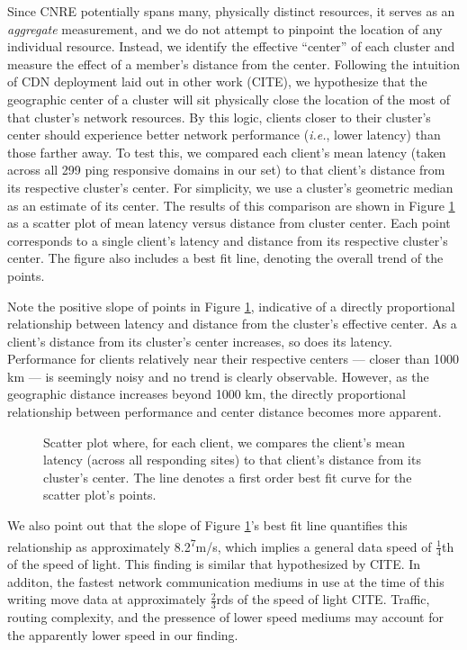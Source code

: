 Since CNRE potentially spans many, physically distinct resources, it serves as
an \emph{aggregate} measurement, and we do not attempt to pinpoint the location
of any individual resource. Instead, we identify the effective ``center'' of
each cluster and measure the effect of a member's distance from the center.
Following the intuition of CDN deployment laid out in other work (CITE), we
hypothesize that the geographic center of a cluster will sit physically close
the location of the most of that cluster's network resources. By this logic,
clients closer to their cluster's center should experience better network
performance (\emph{i.e.}, lower latency) than those farther away. To test this,
we compared each client's mean latency (taken across all 299 ping responsive domains
in our set) to that client's distance from its respective cluster's center. For
simplicity, we use a cluster's geometric median as an estimate of its center.
The results of this comparison are shown in Figure \ref{geoperf} as a scatter
plot of mean latency versus distance from cluster center. Each point corresponds
to a single client's latency and distance from its respective cluster's center.
The figure also includes a best fit line, denoting the overall trend of the
points. 

Note the positive slope of points in Figure \ref{geoperf}, indicative of a
directly proportional relationship between latency and distance from the
cluster's effective center. As a client's distance from its cluster's center
increases, so does its latency. Performance for clients relatively near their
respective centers --- closer than 1000 km --- is seemingly noisy and no trend
is clearly observable.  However, as the geographic distance increases beyond
1000 km, the directly proportional relationship between performance and center
distance becomes more apparent. 

\begin{figure}
    \caption{Scatter plot where, for each client, we compares the client's mean latency
    (across all responding sites) to that client's distance from its cluster's
    center. The line denotes a first order best fit curve for the scatter plot's points.}
    \label{geoperf}
\end{figure}

We also point out that the slope of Figure \ref{geoperf}'s best fit line
quantifies this relationship as approximately
8.2\textsuperscript{7}m/s, which implies a general data speed of
$\frac{1}{4}$th of the speed of light. This finding is similar that hypothesized
by CITE. In additon, the fastest network communication mediums in use at the
time of this writing move data at approximately $\frac{2}{3}$rds of the speed of
light CITE. Traffic, routing complexity, and the pressence of lower speed
mediums may account for the apparently lower speed in our finding.


